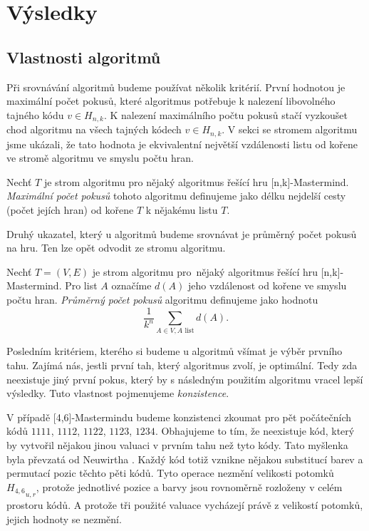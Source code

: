\chapter{Výsledky}

\section{Vlastnosti algoritmů}
Při srovnávání algoritmů budeme používat několik kritérií. První hodnotou je maximální počet pokusů, které algoritmus potřebuje k nalezení libovolného tajného kódu $v \in H_{n,k}$. K nalezení maximálního počtu pokusů stačí vyzkoušet chod algoritmu na všech tajných kódech $v \in H_{n,k}$. V sekci se stromem algoritmu jsme ukázali, že tato hodnota je ekvivalentní největší vzdálenosti listu od kořene ve stromě algoritmu ve smyslu počtu hran.

\begin{definice}\label{defmaxpocetpokusu}
    Nechť $T$ je strom algoritmu pro nějaký algoritmus řešící hru [n,k]-Mastermind. \emph{Maximální počet pokusů} tohoto algoritmu definujeme jako délku nejdelší cesty (počet jejích hran) od kořene $T$ k nějakému listu $T$. 
\end{definice}

Druhý ukazatel, který u algoritmů budeme srovnávat je průměrný počet pokusů na hru. Ten lze opět odvodit ze stromu algoritmu.

\begin{definice}\label{defprumpocetpokusu}
    Nechť $T = (V,E)$ je strom algoritmu pro~nějaký algoritmus řešící hru [n,k]-Mastermind. Pro list $A$ označíme $d(A)$ jeho vzdálenost od kořene ve smyslu počtu hran. \emph{Průměrný počet pokusů} algoritmu definujeme jako hodnotu
    \[\frac{1}{k^n}\sum_{A\in V, A \text{ list}} d(A).\]
\end{definice}

Posledním kritériem, kterého si budeme u algoritmů všímat je výběr prvního tahu. Zajímá nás, jestli první tah, který algoritmus zvolí, je optimální. Tedy zda neexistuje jiný první pokus, který by s následným použitím algoritmu vracel lepší výsledky. Tuto vlastnost pojmenujeme \emph{konzistence}.

V případě [4,6]-Mastermindu budeme konzistenci zkoumat pro pět počátečních kódů $1111$, $1112$, $1122$, $1123$, $1234$. Obhajujeme to tím, že neexistuje kód, který by vytvořil nějakou jinou valuaci v prvním tahu než tyto kódy. Tato myšlenka byla převzatá od Neuwirtha \cite{neuwirth}. Každý kód totiž vznikne nějakou substitucí barev a permutací pozic těchto pěti kódů. Tyto operace nezmění velikosti potomků ${H_{4,6}}_{u,r}$, protože jednotlivé pozice a barvy jsou rovnoměrně rozloženy v celém prostoru kódů. A protože tři použité valuace vycházejí právě z velikostí potomků, jejich hodnoty se nezmění. 

